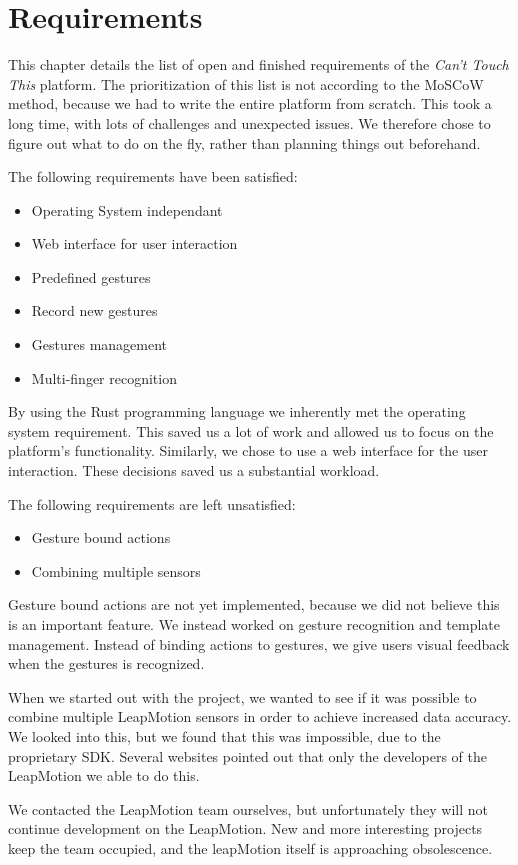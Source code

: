 \documentclass{standalone}
\begin{document}
  \section{Requirements}
  This chapter details the list of open and finished requirements of the
  \textit{Can't Touch This} platform. The prioritization of this list is not
  according to the MoSCoW method, because we had to write the entire platform
  from scratch. This took a long time, with lots of challenges and unexpected
  issues. We therefore chose to figure out what to do on the fly, rather than
  planning things out beforehand.

  The following requirements have been satisfied:
  \begin{itemize}
    \tightlist{}
    \item Operating System independant
    \item Web interface for user interaction
    \item Predefined gestures
    \item Record new gestures
    \item Gestures management
    \item Multi-finger recognition
  \end{itemize}
  By using the Rust programming language we inherently met the operating system
  requirement. This saved us a lot of work and allowed us to focus on the
  platform's functionality. Similarly, we chose to use a web interface for the
  user interaction. These decisions saved us a substantial workload.

  The following requirements are left unsatisfied:
  \begin{itemize}
    \tightlist{}
    \item Gesture bound actions
    \item Combining multiple sensors
  \end{itemize}
  Gesture bound actions are not yet implemented, because we did not believe this
  is an important feature. We instead worked on gesture recognition and template
  management. Instead of binding actions to gestures, we give users visual
  feedback when the gestures is recognized.

  When we started out with the project, we wanted to see if it was possible to
  combine multiple LeapMotion sensors in order to achieve increased data
  accuracy. We looked into this, but we found that this was impossible, due to
  the proprietary SDK. Several websites pointed out that only the developers of
  the LeapMotion we able to do this.

  We contacted the LeapMotion team ourselves, but unfortunately they will not
  continue development on the LeapMotion. New and more interesting projects keep
  the team occupied, and the leapMotion itself is approaching obsolescence.

  \clearpage
\end{document}

